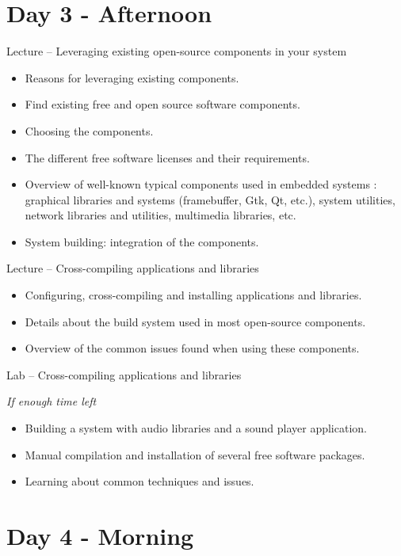 \documentclass[a4paper,12pt,obeyspaces,spaces,hyphens]{article}
\begin{document}
\section{Day 3 - Afternoon}

\feagendaonecolumn
{Lecture – Leveraging existing open-source components in your system}
{
  \begin{itemize}
  \item Reasons for leveraging existing components.
  \item Find existing free and open source software components.
  \item Choosing the components.
  \item The different free software licenses and their requirements.
  \item Overview of well-known typical components used in
        embedded systems : graphical libraries and systems
        (framebuffer, Gtk, Qt, etc.), system utilities,
        network libraries and utilities, multimedia libraries, etc.
  \item System building: integration of the components.
  \end{itemize}
}

\feagendatwocolumn
{Lecture – Cross-compiling applications and libraries}
{
  \begin{itemize}
  \item Configuring, cross-compiling and installing applications and libraries.
  \item Details about the build system used in most open-source components.
  \item Overview of the common issues found when using these components.
  \end{itemize}
}
{Lab – Cross-compiling applications and libraries}
{
  {\em If enough time left}
  \begin{itemize}
  \item Building a system with audio libraries and a sound player application.
  \item Manual compilation and installation of several free software packages.
  \item Learning about common techniques and issues.
  \end{itemize}
}

\section{Day 4 - Morning}
\end{document}
